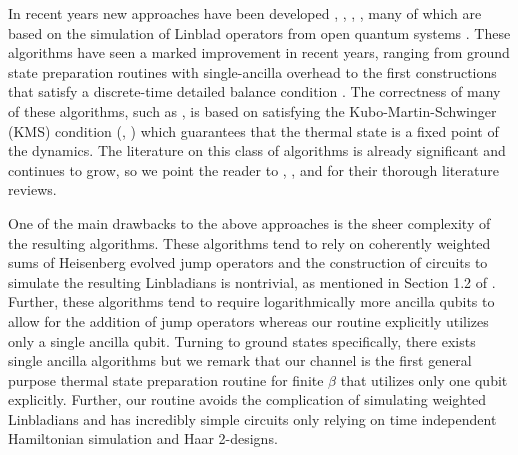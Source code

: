 \documentclass[
 amsmath,amssymb,
 aps,
onecolumn, 
nofootinbib]{revtex4-2}
\begin{document}
In recent years new approaches have been developed \cite{chen2023quantumthermalstatepreparation}, \cite{gilyen2024quantumgeneralizationsglaubermetropolis}, \cite{motlagh2024ground}, \cite{motta2019} \cite{ding2024single}, many of which are based on the simulation of Linblad operators from open quantum systems \cite{davies1974markovian}. These algorithms have seen a marked improvement in recent years, ranging from ground state preparation routines with single-ancilla overhead \cite{ding2024single} to the first constructions that satisfy a discrete-time detailed balance condition \cite{gilyen2024quantumgeneralizationsglaubermetropolis}. The correctness of many of these algorithms, such as \cite{ding2024efficientquantumgibbssamplers}, is based on satisfying the Kubo-Martin-Schwinger (KMS) condition (\cite{kms2}, \cite{kms1}) which guarantees that the thermal state is a fixed point of the dynamics. The literature on this class of algorithms is already significant and continues to grow, so we point the reader to \cite{gilyen2024quantumgeneralizationsglaubermetropolis}, \cite{dalzell2023quantumalgorithmssurveyapplications}, \cite{chen2023quantumthermalstatepreparation} and \cite{rouze2024efficientthermalizationuniversalquantum} for their thorough literature reviews. 

One of the main drawbacks to the above approaches is the sheer complexity of the resulting algorithms. These algorithms tend to rely on coherently weighted sums of Heisenberg evolved jump operators and the construction of circuits to simulate the resulting Linbladians is nontrivial, as mentioned in Section 1.2 of \cite{gilyen2024quantumgeneralizationsglaubermetropolis}. Further, these algorithms tend to require logarithmically more ancilla qubits to allow for the addition of jump operators whereas our routine explicitly utilizes only a single ancilla qubit. Turning to ground states specifically, there exists single ancilla algorithms \cite{ding2024single}  but we remark that our channel is the first general purpose thermal state preparation routine for finite $\beta$ that utilizes only one qubit explicitly. Further, our routine avoids the complication of simulating weighted Linbladians and has incredibly simple circuits only relying on time independent Hamiltonian simulation and Haar 2-designs. 
\end{document}
